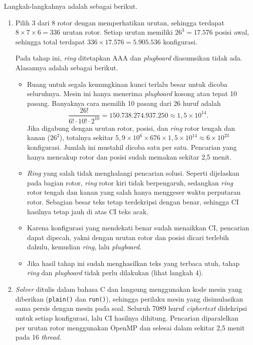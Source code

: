 Langkah-langkahnya adalah sebagai berikut.
\begin{enumerate}
  \item Pilih 3 dari 8 rotor dengan memperhatikan urutan, sehingga
  terdapat $8 \times 7 \times 6 = 336$ urutan rotor. Setiap urutan memiliki $26^3 = 17.576$ posisi awal,
  sehingga total terdapat $336 \times 17.576 = 5.905.536$ konfigurasi.

  Pada tahap ini, \textit{ring} ditetapkan AAA dan \textit{plugboard} diasumsikan tidak ada. Alasannya
  adalah sebagai berikut.
  \begin{itemize}[nosep]
    \item Ruang untuk segala kemungkinan kunci terlalu besar untuk dicoba seluruhnya. Mesin ini hanya menerima
    \textit{plugboard} kosong atau tepat 10 pasang. Banyaknya cara memilih 10 pasang dari 26 huruf adalah
    \begin{equation*}
      \frac{26!}{6! \cdot 10! \cdot 2^{10}} = 150.738.274.937.250 \approx 1{,}5 \times 10^{14}.
    \end{equation*}
    Jika digabung dengan urutan rotor, posisi, dan \textit{ring} rotor tengah dan kanan ($26^2$), totalnya
    sekitar $5{,}9 \times 10^6 \times 676 \times 1{,}5 \times 10^{14} \approx 6 \times 10^{23}$
    konfigurasi. Jumlah ini mustahil dicoba satu per satu. Pencarian yang hanya mencakup rotor dan posisi
    sudah memakan sekitar 2,5 menit.
    \item \textit{Ring} yang salah tidak menghalangi pencarian solusi. Seperti dijelaskan pada bagian rotor,
    \textit{ring} rotor kiri tidak berpengaruh, sedangkan \textit{ring} rotor tengah dan kanan yang salah
    hanya menggeser waktu perputaran rotor. Sebagian besar teks tetap terdekripsi dengan benar, sehingga CI
    hasilnya tetap jauh di atas CI teks acak.
    \item Karena konfigurasi yang mendekati benar sudah menaikkan CI, pencarian dapat dipecah, yakni dengan
    urutan rotor dan posisi dicari terlebih dahulu, kemudian \textit{ring}, lalu \textit{plugboard}.
    \item Jika hasil tahap ini sudah menghasilkan teks yang terbaca utuh, tahap \textit{ring} dan 
    \textit{plugboard} tidak perlu dilakukan (lihat langkah 4).
  \end{itemize}

  \item \textit{Solver} ditulis dalam bahasa C dan langsung menggunakan kode mesin yang diberikan (\texttt{plain()} dan \texttt{run()}),
  sehingga perilaku mesin yang disimulasikan sama persis dengan mesin pada soal. Seluruh 7089 huruf
  \textit{ciphertext} didekripsi untuk setiap konfigurasi, lalu CI hasilnya dihitung. Pencarian
  diparalelkan per urutan rotor menggunakan OpenMP dan selesai dalam sekitar 2,5 menit pada 16
  \textit{thread}.


\end{enumerate}
